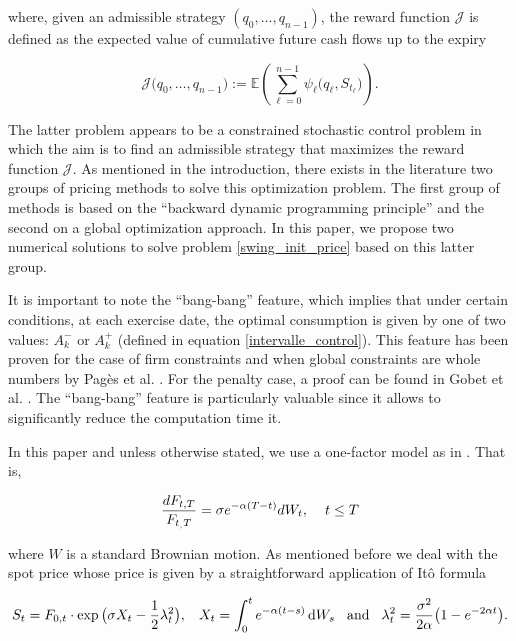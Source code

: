 \documentclass{article}
\newcommand{\q}[1]{``#1''}
\renewcommand{\q}[1]{``#1''}
\numberwithin{equation}{section}
\begin{document}
\noindent
where, given an admissible strategy $(q_0, \ldots, q_{n-1})$, the reward function $\mathcal{J}$ is defined as the expected value of cumulative future cash flows up to the expiry

\begin{equation}
\mathcal{J}\big(q_0, \ldots, q_{n-1}\big) := \mathbb{E}\left(\sum_{\ell=0}^{n-1} \psi_{\ell}\big(q_{\ell}, S_{t_{\ell}} \big)\right).
\end{equation}

The latter problem appears to be a constrained stochastic control problem in which the aim is to find an admissible strategy that maximizes the reward function $\mathcal{J}$. As mentioned in the introduction, there exists in the literature two groups of pricing methods to solve this optimization problem. The first group of methods is based on the \q{backward dynamic programming principle} and the second on a global optimization approach. In this paper, we propose two numerical solutions to solve problem \eqref{swing_init_price} based on this latter group. 


It is important to note the \q{bang-bang} feature, which implies that under certain conditions, at each exercise date, the optimal consumption is given by one of two values: $A_k^-$ or $A_k^+$ (defined in equation \eqref{intervalle_control}). This feature has been proven for the case of firm constraints and when global constraints are whole numbers by Pagès et al. \cite{Bardou2007WhenAS}. For the penalty case, a proof can be found in Gobet et al. \cite{BarreraEsteve2006NumericalMF}. The \q{bang-bang} feature is particularly valuable since it allows to significantly reduce the computation time it.

In this paper and unless otherwise stated, we use a one-factor model as in \cite{BarreraEsteve2006NumericalMF, Jaillet2004ValuationOC}. That is,

\begin{equation}
	\frac{dF_{t, T}}{F_{t_, T}} = \sigma e^{-\alpha (T-t)}dW_t, \hspace{0.4cm}  t \le T
	\label{hjm_model}
\end{equation}

\noindent
where $W$ is a standard Brownian motion. As mentioned before we deal with the spot price whose price is given by a straightforward application of Itô formula

\begin{equation}
\label{spot_model}
S_t = F_{0,t} \cdot \exp\big(\sigma X_t - \frac{1}{2}\lambda_t^2\big), \hspace{0.3cm} X_t = \int_{0}^{t} e^{-\alpha (t-s)}\, \mathrm{d}W_s \hspace{0.3cm} \text{and} \hspace{0.3cm} \lambda_t^2 = \frac{\sigma^2}{2\alpha}\big(1-e^{-2\alpha t}\big).
\end{equation}
\end{document}
